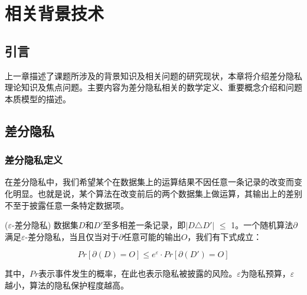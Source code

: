 


\chapter{相关背景技术}
\label{chap:background}

\section{引言}

上一章描述了课题所涉及的背景知识及相关问题的研究现状，本章将介绍差分隐私理论知识及焦点问题。主要内容为差分隐私相关的数学定义、重要概念介绍和问题本质模型的描述。

\section{差分隐私}

\subsection{差分隐私定义}

在差分隐私中，我们希望某个在数据集上的运算结果不因任意一条记录的改变而变化明显。也就是说，某个算法在改变前后的两个数据集上做运算，其输出上的差别不至于披露任意一条特定数据项。

\begin{defn}
	
($\varepsilon$\textsc{-差分隐私})\supercite{Dwork-Calibrating} 数据集$D$和$D'$至多相差一条记录，即$|D$$\triangle$$D'|$ $\leqslant$ 1。一个随机算法$\partial$满足$\varepsilon$-差分隐私，当且仅当对于$\partial$任意可能的输出$O$，我们有下式成立：

\begin{equation}
  \label{eq:res1}
	 Pr[\partial(D) = O] \leqslant e^{\varepsilon} \cdot Pr[\partial(D') = O]
\end{equation}


其中，$Pr$表示事件发生的概率，在此也表示隐私被披露的风险。$\varepsilon$为隐私预算，$\varepsilon$越小，算法的隐私保护程度越高。

\end{defn}

